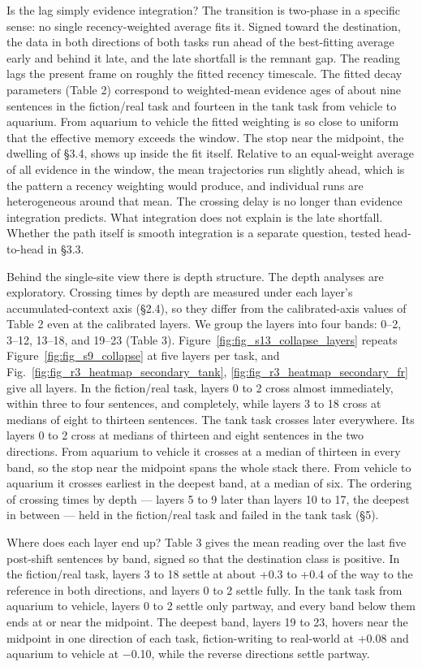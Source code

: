\documentclass[11pt]{article}
\begin{document}
Is the lag simply evidence integration? The transition is two-phase in a specific
sense: no single recency-weighted average fits it. Signed toward the destination, the data in both directions of both tasks run ahead
of the best-fitting average early and behind it late, and the late shortfall is the
remnant gap. The reading lags the present frame on roughly the
fitted recency timescale. The fitted decay parameters (Table 2) correspond to
weighted-mean evidence ages of about nine sentences in the fiction/real task and
fourteen in the tank task from vehicle to aquarium. From aquarium to vehicle the
fitted weighting is so close to uniform that the effective memory exceeds the window.
The stop near the midpoint, the dwelling of \S3.4, shows up inside the fit itself. Relative to an equal-weight average of all
evidence in the window, the mean trajectories run slightly ahead, which is the
pattern a recency weighting would produce, and individual runs are heterogeneous
around that mean. The crossing delay is no longer than evidence integration predicts. What integration
does not explain is the late shortfall. Whether the path itself is smooth
integration is a separate question, tested head-to-head in \S3.3.

Behind the single-site view there is depth structure. The depth analyses are exploratory. Crossing times by depth are measured under each layer's
accumulated-context axis (\S2.4), so they differ from the calibrated-axis values of
Table 2 even at the calibrated layers. We group the layers into four bands: 0–2,
3–12, 13–18, and 19–23 (Table 3). Figure~\ref{fig:fig_s13_collapse_layers} repeats Figure~\ref{fig:fig_s9_collapse} at five layers per task, and Fig.~\ref{fig:fig_r3_heatmap_secondary_tank}, \ref{fig:fig_r3_heatmap_secondary_fr} give all layers. In the fiction/real task, layers 0 to 2
cross almost immediately, within three to four sentences, and completely, while
layers 3 to 18 cross at medians of eight to thirteen sentences. The tank task crosses
later everywhere. Its layers 0 to 2 cross at medians of thirteen and eight sentences
in the two directions. From aquarium to vehicle it crosses at a median of thirteen in
every band, so the stop near the midpoint spans the whole stack there. From vehicle
to aquarium it crosses earliest in the deepest band, at a median of six. The ordering of
crossing times by depth — layers 5 to 9 later than layers 10 to 17, the deepest in
between — held in the fiction/real task and failed in the tank task (\S5).

Where does each layer end up? Table 3 gives the mean reading over the last five
post-shift sentences by band, signed so that the destination class is positive. In
the fiction/real task, layers 3 to 18 settle at about +0.3 to +0.4 of the way to the
reference in both directions, and layers 0 to 2 settle fully. In the tank task from
aquarium to vehicle, layers 0 to 2 settle only partway, and every band below them
ends at or near the midpoint. The deepest band, layers 19 to 23, hovers near the midpoint in one direction
of each task, fiction-writing to real-world at +0.08 and aquarium to vehicle at $-$0.10, while the
reverse directions settle partway.
\end{document}
